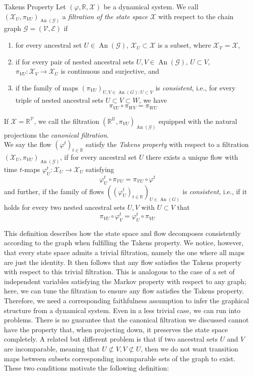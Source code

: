 \documentclass[11pt, a4paper]{memoir}
\theoremstyle{break}
\theoremstyle{break}
\theoremstyle{nonumberplain}
\newcommand{\mR}{\mathbb{R}}
\DeclareMathOperator{\an}{An}
\begin{document}
\begin{mydefinition}{Takens Property}
Let $(\varphi,\mR,\mathcal{X})$ be a dynamical system. We call $(\mathcal{X}_U,\pi_{VU})_{\an(\mathcal{G})}$ a \emph{filtration of the state space $\mathcal{X}$} with respect to the chain graph $\mathcal{G}=(\mathcal{V},\mathcal{E})$ if
\begin{enumerate}[label=\roman*)]
\item for every ancestral set $U\in \an(\mathcal{G})$, $\mathcal{X}_U\subset \mathcal{X}$ is a subset, where $\mathcal{X}_{\mathcal{V}}=\mathcal{X}$,
\item if for every pair of nested ancestral sets $U,V\in \an(\mathcal{G})$, $U\subset V$, $\pi_{VU}:\mathcal{X}_V\to \mathcal{X}_U$ is continuous and surjective, and
\item if the family of maps $(\pi_{VU})_{U,V\in \an(G): U\subset V}$ is \emph{consistent}, i.e., for every triple of nested ancestral sets $U\subset V\subset W$, we have
$$\pi_{VU}\circ \pi_{WV}=\pi_{WU}$$
\end{enumerate}
If $\mathcal{X}=\mR^\mathcal{V}$, we call the filtration $(\mR^{\mathcal{U}},\pi_{VU})_{\an(\mathcal{G})}$ equipped with the natural projections the \emph{canonical filtration}.\\[5pt]
We say the flow $(\varphi^t)_{t\in \mR}$ satisfy the \emph{Takens property} with respect to a filtration $(\mathcal{X}_U,\pi_{VU})_{\an(\mathcal{G})}$, if for every ancestral set $U$ there exists a unique flow with time $t$-maps $\varphi^t_U: \mathcal{X}_U\to\mathcal{X}_U$ satisfying
$$\varphi^t_{U}\circ \pi_{\mathcal{V}U}=\pi_{\mathcal{V}U}\circ \varphi^t$$
and further, if the family of flows $((\varphi_U^t)_{t\in \mR})_{U\in \an(G)}$ is \emph{consistent}, i.e., if it holds for every two nested ancestral sets $U,V$ with $U\subset V$ that
$$\pi_{VU}\circ\varphi_V^t=\varphi_U^t\circ \pi_{VU}$$
\end{mydefinition}
This definition describes how the state space and flow decomposes consistently according to the graph when fulfilling the Takens property. We notice, however, that every state space admits a trivial filtration, namely the one where all maps are just the identity. It then follows that any flow satisfies the Takens property with respect to this trivial filtration. This is analogous to the case of a set of independent variables satisfying the Markov property with respect to any graph; here, we can tune the filtration to ensure any flow satisfies the Takens property. Therefore, we need a corresponding faithfulness assumption to infer the graphical structure from a dynamical system. Even in a less trivial case, we can run into problems. There is no guarantee that the canonical filtration we discussed cannot have the property that, when projecting down, it preserves the state space completely. A related but different problem is that if two ancestral sets $U$ and $V$ are incomparable, meaning that $U\not\subset V, V\not\subset U$, then we do not want transition maps between subsets corresponding incomparable sets of the graph to exist. These two conditions motivate the following definition:
\end{document}

